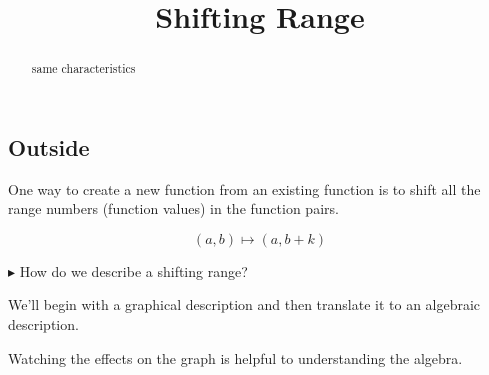 \documentclass{ximera}
\title{Shifting Range}
\begin{document}
\begin{abstract}
same characteristics
\end{abstract}
\maketitle









\subsection*{Outside}



One way to create a new function from an existing function is to shift all the range numbers (function values) in the function pairs. 

\[
(a, b) \mapsto (a, b + k)
\]



\textbf{\textcolor{blue!55!black}{$\blacktriangleright$}} How do we describe a shifting range? 

We'll begin with a graphical description and then translate it to an algebraic description. 



Watching the effects on the graph is helpful to understanding the algebra.
\end{document}
